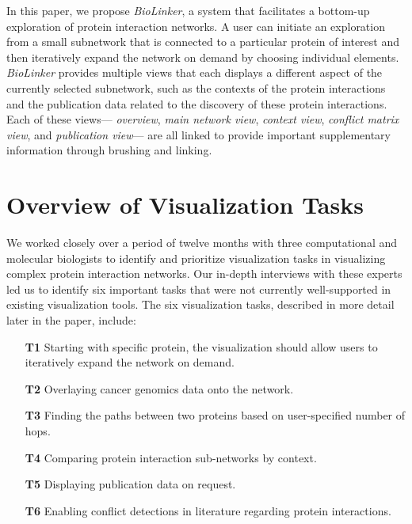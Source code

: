 \documentclass[journal]{vgtc}                %
\newcommand{\theName}{\textit{BioLinker}}
\begin{document}
In this paper, we propose \theName{}, a system that facilitates a bottom-up exploration of protein interaction networks. A user can initiate an exploration from a small subnetwork that is connected to a particular protein of interest and then iteratively expand the network on demand by choosing individual elements. \theName{} provides multiple views that each displays a different aspect of the currently selected subnetwork, such as the contexts of the protein interactions and the publication data related to the discovery of these protein interactions. Each of these views--- \textit{overview}, \textit{main network view}, \textit{context view}, \textit{conflict matrix view}, and \textit{publication view}--- are all linked to provide important supplementary information through brushing and linking.
 
 
 
\section{Overview of Visualization Tasks}
We worked closely over a period of twelve months with three computational and molecular biologists to identify and prioritize visualization tasks in visualizing complex protein interaction networks. Our in-depth interviews with these experts led us to identify six important tasks that were not currently well-supported in existing visualization tools. The six visualization tasks, described in more detail later in the paper, include:
\begin{itemize}[noitemsep,nolistsep]
\item[\textbf{T1}]{Starting with specific protein, the visualization should allow users to iteratively expand the network on demand.}
\item[\textbf{T2}]{Overlaying cancer genomics data onto the network.}
\item[\textbf{T3}]{Finding the paths between two proteins based on user-specified number of hops.}
\item[\textbf{T4}]{Comparing protein interaction sub-networks by context.}
\item[\textbf{T5}]{Displaying publication data on request.}
\item[\textbf{T6}]{Enabling conflict detections in literature regarding protein interactions.}
\end{itemize}
\end{document}
